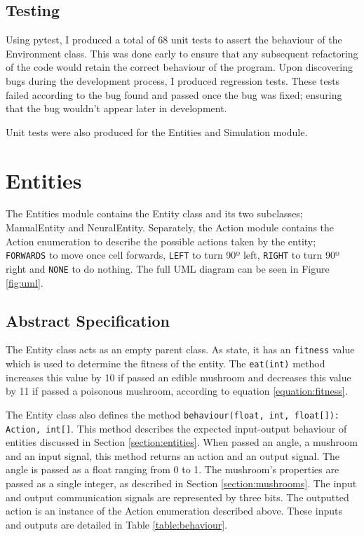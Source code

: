 \documentclass[12pt,a4paper]{report}
\begin{document}
\subsection{Testing}

Using pytest, I produced a total of 68 unit tests to assert the behaviour of the Environment class. This was done early to ensure that any subsequent refactoring of the code would retain the correct behaviour of the program. Upon discovering bugs during the development process, I produced regression tests. These tests failed according to the bug found and passed once the bug was fixed; ensuring that the bug wouldn't appear later in development.

Unit tests were also produced for the Entities and Simulation module.

\section{Entities}

The Entities module contains the Entity class and its two subclasses; ManualEntity and NeuralEntity. Separately, the Action module contains the Action enumeration to describe the possible actions taken by the entity; \texttt{FORWARDS} to move once cell forwards, \texttt{LEFT} to turn 90º left, \texttt{RIGHT} to turn 90º right and \texttt{NONE} to do nothing. The full UML diagram can be seen in Figure \ref{fig:uml}.

\subsection{Abstract Specification}

The Entity class acts as an empty parent class. As state, it has an \texttt{fitness} value which is used to determine the fitness of the entity. The \texttt{eat(int)} method increases this value by 10 if passed an edible mushroom and decreases this value by 11 if passed a poisonous mushroom, according to equation \ref{equation:fitness}. 

The Entity class also defines the method \texttt{behaviour(float, int, float[]): Action, int[]}. This method describes the expected input-output behaviour of entities discussed in Section \ref{section:entities}. When passed an angle, a mushroom and an input signal, this method returns an action and an output signal. The angle is passed as a float ranging from 0 to 1. The mushroom's properties are passed as a single integer, as described in Section \ref{section:mushrooms}. The input and output communication signals are represented by three bits. The outputted action is an instance of the Action enumeration described above. These inputs and outputs are detailed in Table \ref{table:behaviour}. 
\end{document}
